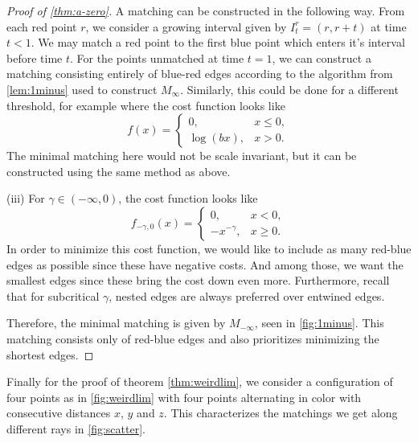 \documentclass{article}
\begin{document}
\begin{proof}[Proof of \cref{thm:a-zero}]
      A matching can be constructed in the following way. From each
      red point $r$, we consider a growing interval given by $I^r_t =
      (r,r+t)$ at time $t<1$. We may match a red point to the first
      blue point which enters it's interval before time $t$. For the
      points unmatched at time $t=1$, we can construct a matching
      consisting entirely of blue-red edges according to the algorithm
      from \cref{lem:1minus} used to construct $M_{\infty}$.
      Similarly, this could be done for a different threshold, for
      example where the cost function looks like
      \[ f(x) =
        \begin{cases}
          0,&x\leq 0,\\
          \log(bx),&x>0.
        \end{cases}
      \]
      The minimal matching here would not be scale invariant, but it can
      be constructed using the same method as above.

      (iii) For $\gamma\in(-\infty,0)$, the cost function looks
      like \[  f_{-\gamma,0}(x)=
           \begin{cases}
             0 ,& x<0,\nonumber\\             - x^{-\gamma}, & x\geq
             0.
           \end{cases} \]
       In order to minimize this cost
                                 function, we would like to include as
                                 many red-blue edges as possible since
                                 these have negative costs. And among
                                 those, we want the smallest edges
                                 since these bring the cost down even
                                 more. Furthermore, recall that for
       subcritical $\gamma$, nested edges are always preferred over entwined
       edges.

Therefore, the minimal matching is given by $M_{-\infty}$, seen
in \cref{fig:1minus}. This matching consists only of red-blue edges
and also prioritizes minimizing the shortest edges.
\end{proof}


Finally for the proof of theorem \cref{thm:weirdlim}, we consider a
configuration of four points as in \cref{fig:weirdlim} with four
points alternating in color with consecutive distances $x$, $y$ and
$z$. This characterizes the matchings we get along different rays in
\cref{fig:scatter}.
\end{document}
